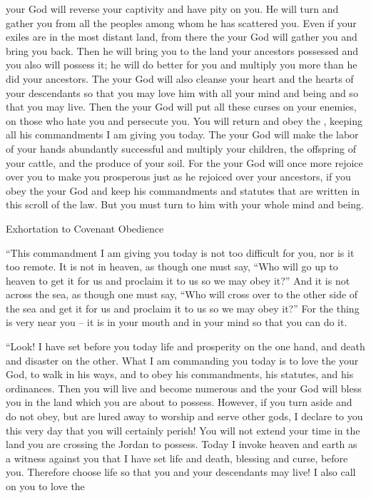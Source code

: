 {{}
your God
will reverse
your captivity
and have pity
on you. He will turn
and gather
you from all
the peoples
among
whom
he
has scattered you.
Even if
your exiles
are in the most distant
land,
from there
the {}
your God
will gather
you and bring
you back.
Then he will bring
you to
the land
your ancestors
possessed
and you also
will possess
it; he will do better for you and multiply
you more than he did your ancestors.
The
{}
your God
will also cleanse
your heart
and the hearts
of your descendants
so that you may love
him with all
your mind
and being
and so that you may
live.
Then
the {}
your God
will put all
these
curses
on
your enemies,
on
those who hate
you and persecute you.
You
will return
and obey
the {}, keeping
all
his commandments
I am
giving
you today.
The
{}
your God
will make the labor
of your hands
abundantly successful
and multiply your children,
the offspring
of your cattle,
and the produce
of your soil.
For
the
{} your God
will once more
rejoice
over
you to make you prosperous
just
as he rejoiced
over
your ancestors,
if
you obey
the {}
your God
and keep
his commandments
and statutes
that are written
in this
scroll
of the law.
But
you must turn
to him
with your whole
mind
and being.
\par }{\SH Exhortation to Covenant Obedience
\par }{\PP {}“This
commandment
I am
giving
you today
is not
too difficult
for you, nor
is it
too
remote.
It is not
in heaven,
as though
one must say,
“Who
will go up
to heaven
to get
it for us and proclaim
it to us so we may obey it?”
And it is not
across
the sea,
as though
one must say,
“Who
will cross
over to
the other side
of the sea
and get
it for us and proclaim
it to us so we may obey it?”
For
the thing
is very
near you – it is in your mouth and in your mind so that you can do it.
\par }{\PP {}“Look! I have set
before
you today
life
and prosperity
on the one hand, and death
and disaster on the other.
What
I
am commanding
you today
is to love
the {}
your God,
to walk
in his ways,
and to obey
his commandments,
his statutes,
and his ordinances.
Then you will live
and become numerous
and the
{}
your God
will bless
you in the land
which
you
are about to possess.
However, if
you turn
aside
and do not
obey,
but are lured
away to worship
and serve
other
gods,
I declare
to you this very day
that
you will certainly
perish! You will not
extend
your time
in
the land
you
are crossing
the Jordan
to possess.
Today
I invoke
heaven
and earth
as a witness against you that I
have set
life
and death,
blessing
and curse,
before
you. Therefore choose
life
so
that you
and your descendants
may live!
I also call on you to love
the

}
